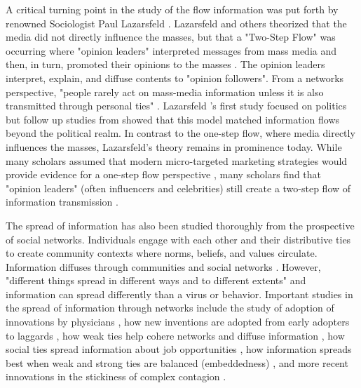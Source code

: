 A critical turning point in the study of the flow information was put forth by renowned Sociologist Paul Lazarsfeld \citeyearpar{lazarsfeldPeopleChoice1944}. Lazarsfeld and others theorized that the media did not directly influence the masses, but that a "Two-Step Flow" was occurring where "opinion leaders" interpreted messages from mass media and then, in turn, promoted their opinions to the masses \citep{katzPersonalInfluencePart1955}. The opinion leaders interpret, explain, and diffuse contents to "opinion followers". From a networks
perspective, "people rarely act on mass-media information unless it is also transmitted through personal ties" \citep[p. 1374]{granovetterStrengthWeakTies1973}. Lazarsfeld  \citeyearpar{lazarsfeldPeopleChoice1944}'s first study focused on politics but follow up studies from \citep{katzPersonalInfluencePart1955} showed that this model matched information flows beyond the political realm. In contrast to the one-step flow, where media directly influences the masses, Lazarsfeld's theory remains in prominence today. While many scholars assumed that modern micro-targeted marketing strategies would provide evidence for a one-step flow perspective \citep{bennettOneStepFlowCommunication2006}, many scholars find that "opinion leaders" (often influencers and celebrities) still create a two-step flow of information transmission \citep{choi15, hilbertOneStepTwo2017}.

The spread of information has also been studied thoroughly from the
prospective of social networks. Individuals engage with each other and
their distributive ties to create community contexts where norms,
beliefs, and values circulate. Information diffuses through communities
and social networks \citep{fowler2010cooperative, bond_etal12, klarEffectNetworkStructure2017}.
However, "different things spread in different ways and to
different extents" \citep[p. 563]{christakisSocialContagionTheory2013} and information can
spread differently than a virus or behavior. Important studies in the
spread of information through networks include the study of adoption of
innovations by physicians \citep{colemanDiffusionInnovationPhysicians1957}, how new
inventions are adopted from early adopters to laggards \citep{rogersDiffusionInnovations1962},
how weak ties help cohere networks and diffuse information
\citep{granovetterStrengthWeakTies1973}, how social ties spread information about job
opportunities \citep{granovetterGettingJobStudy1995, montgomeryJobSearchNetwork1992}, how information
spreads best when weak and strong ties are balanced (embeddedness) \citep{uzziSocialStructureCompetition1997}, and more recent innovations in the stickiness of complex contagion \citep{centolaComplexContagionsWeakness2007}.

